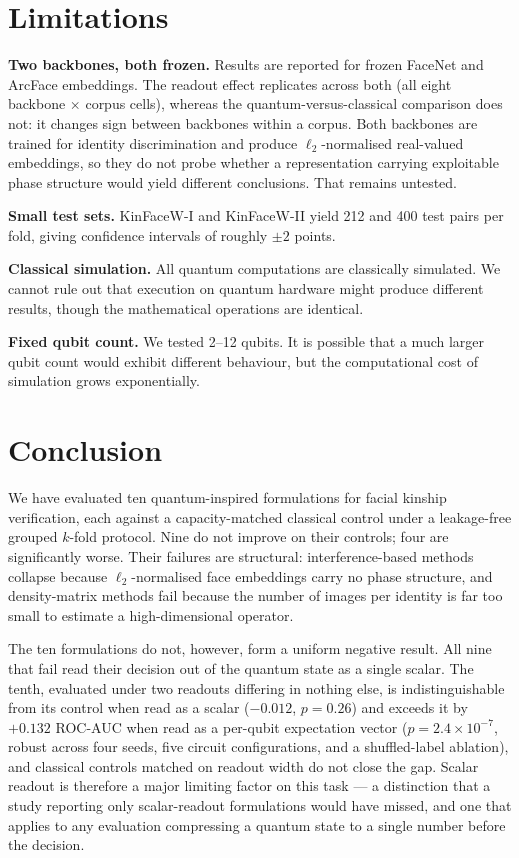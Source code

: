 \documentclass[preprint,12pt]{elsarticle}
\begin{document}
\section{Limitations}
\label{sec:limitations}

\textbf{Two backbones, both frozen.} Results are reported for frozen
FaceNet and ArcFace embeddings. The readout effect replicates across both
(all eight backbone $\times$ corpus cells), whereas the
quantum-versus-classical comparison does not: it changes sign between
backbones within a corpus. Both backbones are trained for identity
discrimination and produce $\ell_2$-normalised real-valued embeddings, so
they do not probe whether a representation carrying exploitable phase
structure would yield different conclusions. That remains untested.

\textbf{Small test sets.} KinFaceW-I and KinFaceW-II yield 212 and 400 test
pairs per fold, giving confidence intervals of roughly $\pm 2$ points.

\textbf{Classical simulation.} All quantum computations are classically
simulated. We cannot rule out that execution on quantum hardware might
produce different results, though the mathematical operations are identical.

\textbf{Fixed qubit count.} We tested 2--12 qubits. It is possible that a
much larger qubit count would exhibit different behaviour, but the
computational cost of simulation grows exponentially.

\section{Conclusion}
\label{sec:conclusion}

We have evaluated ten quantum-inspired formulations for facial kinship
verification, each against a capacity-matched classical control under a
leakage-free grouped $k$-fold protocol. Nine do not improve on their controls;
four are significantly worse. Their failures are structural: interference-based
methods collapse because $\ell_2$-normalised face embeddings carry no phase
structure, and density-matrix methods fail because the number of images per
identity is far too small to estimate a high-dimensional operator.

The ten formulations do not, however, form a uniform negative result. All nine
that fail read their decision out of the quantum state as a single scalar. The
tenth, evaluated under two readouts differing in nothing else, is
indistinguishable from its control when read as a scalar ($-0.012$, $p = 0.26$)
and exceeds it by $+0.132$ ROC-AUC when read as a per-qubit expectation vector
($p = 2.4 \times 10^{-7}$, robust across four seeds, five circuit
configurations, and a shuffled-label ablation), and classical controls matched
on readout width do not close the gap. Scalar readout is therefore a major
limiting factor on this task --- a distinction that a study reporting only
scalar-readout formulations would have missed, and one that applies to any
evaluation compressing a quantum state to a single number before the decision.
\end{document}
